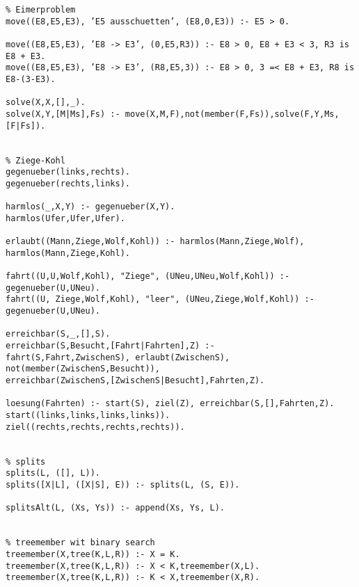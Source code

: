 \documentclass{article}
\begin{document}
\begin{verbatim}
% Eimerproblem
move((E8,E5,E3), ’E5 ausschuetten’, (E8,0,E3)) :- E5 > 0.

move((E8,E5,E3), ’E8 -> E3’, (0,E5,R3)) :- E8 > 0, E8 + E3 < 3, R3 is E8 + E3.
move((E8,E5,E3), ’E8 -> E3’, (R8,E5,3)) :- E8 > 0, 3 =< E8 + E3, R8 is E8-(3-E3).

solve(X,X,[],_).
solve(X,Y,[M|Ms],Fs) :- move(X,M,F),not(member(F,Fs)),solve(F,Y,Ms,[F|Fs]).


% Ziege-Kohl
gegenueber(links,rechts).
gegenueber(rechts,links).

harmlos(_,X,Y) :- gegenueber(X,Y).
harmlos(Ufer,Ufer,Ufer).

erlaubt((Mann,Ziege,Wolf,Kohl)) :- harmlos(Mann,Ziege,Wolf), harmlos(Mann,Ziege,Kohl).

fahrt((U,U,Wolf,Kohl), "Ziege", (UNeu,UNeu,Wolf,Kohl)) :- gegenueber(U,UNeu).
fahrt((U, Ziege,Wolf,Kohl), "leer", (UNeu,Ziege,Wolf,Kohl)) :- gegenueber(U,UNeu).

erreichbar(S,_,[],S).
erreichbar(S,Besucht,[Fahrt|Fahrten],Z) :-
fahrt(S,Fahrt,ZwischenS), erlaubt(ZwischenS), not(member(ZwischenS,Besucht)),
erreichbar(ZwischenS,[ZwischenS|Besucht],Fahrten,Z).

loesung(Fahrten) :- start(S), ziel(Z), erreichbar(S,[],Fahrten,Z).
start((links,links,links,links)).
ziel((rechts,rechts,rechts,rechts)).


% splits
splits(L, ([], L)).
splits([X|L], ([X|S], E)) :- splits(L, (S, E)).

splitsAlt(L, (Xs, Ys)) :- append(Xs, Ys, L).


% treemember wit binary search
treemember(X,tree(K,L,R)) :- X = K.
treemember(X,tree(K,L,R)) :- X < K,treemember(X,L).
treemember(X,tree(K,L,R)) :- K < X,treemember(X,R).
\end{verbatim}

\clearpage
\end{document}

